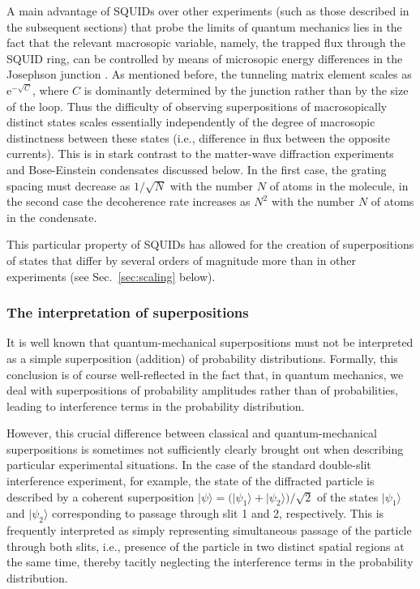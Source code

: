 \documentclass[twocolumn,aps,floatfix,amsmath,amssymb,showpacs,nofootinbib]{revtex4}
\newcommand{\ket}[1]{\ensuremath{|{#1\rangle}}}
\newcommand{\e}{\ensuremath{\mathrm{e}}}
\begin{document}
A main advantage of SQUIDs over other experiments (such as those
described in the subsequent sections) that probe the limits of quantum
mechanics lies in the fact that the relevant macrosopic variable,
namely, the trapped flux through the SQUID ring, can be controlled by
means of microsopic energy differences in the Josephson junction
\cite{Leggett:2002:uy}. As mentioned before, the tunneling matrix
element scales as $\e^{-\sqrt{C}}$, where $C$ is dominantly
determined by the junction rather than by the size of the loop. Thus
the difficulty of observing superpositions of macrosopically distinct
states scales essentially independently of the degree of macrosopic
distinctness between these states (i.e., difference in flux between
the opposite currents). This is in stark contrast to the matter-wave
diffraction experiments and Bose-Einstein condensates discussed below.
In the first case, the grating spacing must decrease as $1/\sqrt{N}$
with the number $N$ of atoms in the molecule, in the second case the
decoherence rate increases as $N^2$ with the number $N$ of atoms in the
condensate.

This particular property of SQUIDs has allowed for the creation of
superpositions of states that differ by several orders of magnitude
more than in other experiments (see Sec.~\ref{sec:scaling} below).


\subsubsection{The interpretation of superpositions}  \label{sec:interpret-superpos}

It is well known that quantum-mechanical superpositions must not be
interpreted as a simple superposition (addition) of probability
distributions.  Formally, this conclusion is of course well-reflected
in the fact that, in quantum mechanics, we deal with superpositions of
probability amplitudes rather than of probabilities, leading to
interference terms in the probability distribution.

However, this crucial difference between classical and
quantum-mechanical superpositions is sometimes not sufficiently
clearly brought out when describing particular experimental
situations. In the case of the standard double-slit interference
experiment, for example, the state of the diffracted particle is
described by a coherent superposition $\ket{\psi} = \bigl(
\ket{\psi_1} + \ket{\psi_2} \bigr) / \sqrt{2}$ of the states
$\ket{\psi_1}$ and $\ket{\psi_2}$ corresponding to passage through
slit 1 and 2, respectively. This is frequently interpreted as simply
representing simultaneous passage of the particle through both slits,
i.e., presence of the particle in two distinct spatial regions at the
same time, thereby tacitly neglecting the interference terms in the
probability distribution.
\end{document}
